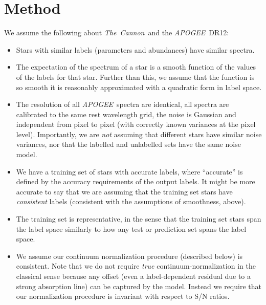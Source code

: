 \documentclass[12pt,preprint]{aastex}
\newcommand{\project}[1]{\textsl{#1}}
\newcommand{\TheCannon}{\project{The~Cannon}}
\newcommand{\acronym}[1]{{\small{#1}}}
\newcommand{\apogee}{\project{\acronym{APOGEE}}}
\newcommand{\dr}{\acronym{DR12}}
\begin{document}
\section{Method}

\noindent{}We assume the following about \TheCannon\ and the \apogee\ \dr:

\begin{itemize}
\item
Stars with similar labels (parameters and abundances) have similar spectra.
\item
The expectation of the spectrum of a star is a smooth function of the values of 
the labels for that star.  Further than this, we assume that the function is so 
smooth it is reasonably approximated with a quadratic form in label space.
\item
The resolution of all \apogee\ spectra are identical, all spectra are calibrated
to the same rest wavelength grid, the noise is Gaussian and independent from 
pixel to pixel (with correctly known variances at the pixel level).  
Importantly, we are \emph{not} assuming that different stars have similar noise
variances, nor that the labelled and unlabelled sets have the same noise model.
\item
We have a training set of stars with accurate labels, where ``accurate'' is 
defined by the accuracy requirements of the output labels.  It might be more 
accurate to say that we are assuming that the training set stars have 
\emph{consistent} labels (consistent with the assumptions of smoothness, above).
\item
The training set is representative, in the sense that the training set stars 
span the label space similarly to how any test or prediction set spans the label
space.
\item
We assume our continuum normalization procedure (described below) is consistent.
Note that we do not require \emph{true} continuum-normalization in the classical
sense because any offset (even a label-dependent residual due to a strong 
absorption line) can be captured by the model.  Instead we require that our 
normalization procedure is invariant with respect to S/N ratios.
\end{itemize}
\end{document}
